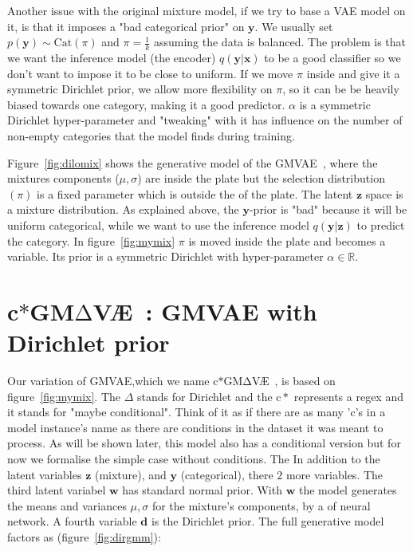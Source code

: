 \documentclass[11pt, a4paper]{report}
\theoremstyle{plain}
\theoremstyle{definition}
\theoremstyle{remark}
\newcommand{\R}{\mathbb{R}}
\newcommand{\x}{\mathbf{x}}
\newcommand{\z}{\mathbf{z}}
\newcommand{\y}{\mathbf{y}}
\newcommand{\w}{\mathbf{w}}
\newcommand{\dd}{\mathbf{d}}
\newcommand{\gmvae}{c$\ast$GM$\mathrm{\Delta}$V\AE~}
\begin{document}
Another issue with the original mixture model, if we try to base a VAE model on
it, is that it imposes a "bad categorical prior" on $\y$. We usually set $p(\y) \sim
\text{Cat}(\pi)$ and $\pi=\frac{1}{k}$ assuming the data is balanced. The
problem is that we want the inference model (the encoder) $q(\y | \x)$ to be a
good classifier so we don't want to impose it to be close to uniform. 
If we move
$\pi$ inside and give it a symmetric Dirichlet prior, we allow more
flexibility on $\pi$, so it can be be heavily biased towards one category, making it a good
predictor. $\alpha$ is a symmetric Dirichlet hyper-parameter and "tweaking" with
it has influence on the number of non-empty categories that the model finds
during training.

Figure~\ref{fig:dilomix} shows the generative model of the
GMVAE~\cite{dilokthanakul2016deep}, where the mixtures components ($\mu,
\sigma$) are inside the plate but the selection distribution $(\pi)$ is a fixed
parameter which is outside the of the plate. The latent $\z$ space is a mixture
distribution. As explained above, the $\y$-prior is "bad" because it will be
uniform categorical, while we want to use the inference model $q(\y | \z)$ to
predict the category. In figure~\ref{fig:mymix} $\pi$ is moved inside the plate
and becomes a variable. Its prior is a symmetric Dirichlet with hyper-parameter
$\alpha \in \R$.

\section{\gmvae: GMVAE with Dirichlet prior}

Our variation of GMVAE,which we name \gmvae, is based on figure~\ref{fig:mymix}.
The $\Delta$ stands for Dirichlet and the $\mathrm{c}\ast$ represents a regex
and it stands for "maybe
conditional". Think of it as if there are as many 'c's in a model instance's
name as
there are conditions in the dataset it was meant to process. As will be shown later,
this model also has a conditional
version but for now we formalise the simple case without conditions. The 
In addition to the latent variables $\z$ (mixture), and $\y$ (categorical), there
$2$ more variables.
The third latent variabel $\w$ has standard normal prior.
With $\w$ the model generates the means and variances $\mu,
\sigma$ for the mixture's components, by a of neural network.
A fourth variable $\dd$ is the Dirichlet prior.
The full generative model factors as (figure~\ref{fig:dirgmm}):
\end{document}

